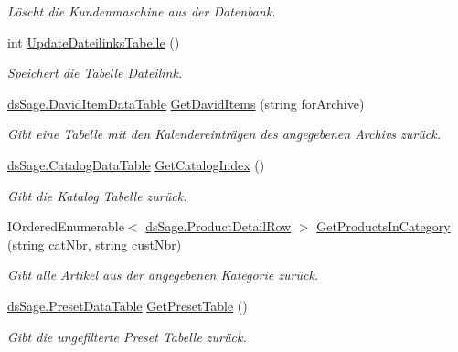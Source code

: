 \begin{DoxyCompactItemize}
\begin{DoxyCompactList}\small\item\em Löscht die Kundenmaschine aus der Datenbank. \end{DoxyCompactList}\item 
int \hyperlink{class_products_1_1_data_1_1_data_service_ac54ad71d6fd294fbda7c399dbb891070}{Update\+Dateilinks\+Tabelle} ()
\begin{DoxyCompactList}\small\item\em Speichert die Tabelle Dateilink. \end{DoxyCompactList}\item 
\hyperlink{class_products_1_1_data_1_1ds_sage_1_1_david_item_data_table}{ds\+Sage.\+David\+Item\+Data\+Table} \hyperlink{class_products_1_1_data_1_1_data_service_aad9f5e9e517f18ce58939e26026eb2df}{Get\+David\+Items} (string for\+Archive)
\begin{DoxyCompactList}\small\item\em Gibt eine Tabelle mit den Kalendereinträgen des angegebenen Archivs zurück. \end{DoxyCompactList}\item 
\hyperlink{class_products_1_1_data_1_1ds_sage_1_1_catalog_data_table}{ds\+Sage.\+Catalog\+Data\+Table} \hyperlink{class_products_1_1_data_1_1_data_service_a38c3bdd4ca8a1e77d3b9b54a9ce9d657}{Get\+Catalog\+Index} ()
\begin{DoxyCompactList}\small\item\em Gibt die Katalog Tabelle zurück. \end{DoxyCompactList}\item 
I\+Ordered\+Enumerable$<$ \hyperlink{class_products_1_1_data_1_1ds_sage_1_1_product_detail_row}{ds\+Sage.\+Product\+Detail\+Row} $>$ \hyperlink{class_products_1_1_data_1_1_data_service_a7da47bf74e7bdbfb0b92d60a0d167d59}{Get\+Products\+In\+Category} (string cat\+Nbr, string cust\+Nbr)
\begin{DoxyCompactList}\small\item\em Gibt alle Artikel aus der angegebenen Kategorie zurück. \end{DoxyCompactList}\item 
\hyperlink{class_products_1_1_data_1_1ds_sage_1_1_preset_data_table}{ds\+Sage.\+Preset\+Data\+Table} \hyperlink{class_products_1_1_data_1_1_data_service_adf6881622258c13acd75d91d49ef715f}{Get\+Preset\+Table} ()
\begin{DoxyCompactList}\small\item\em Gibt die ungefilterte Preset Tabelle zurück. \end{DoxyCompactList}\item 

\end{DoxyCompactItemize}
